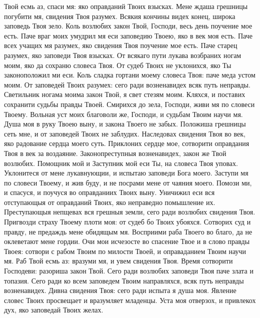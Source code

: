 \begin{mymulticols}
Твой есмь аз, спаси мя: яко оправданий Твоих взысках. Мене ждаша грешницы погубити мя, свидения Твоя разумех. Всякия кончины видех конец, широка заповедь Твоя зело. Коль возлюбих закон Твой, Господи, весь день поучение мое есть. Паче враг моих умудрил мя еси заповедию Твоею, яко в век моя есть. Паче всех учащих мя разумех, яко свидения Твоя поучение мое есть. Паче старец разумех, яко заповеди Твоя взысках. От всякаго пути лукава возбраних ногам моим, яко да сохраню словеса Твоя. От судеб Твоих не уклонихся, яко Ты законоположил ми еси. Коль сладка гортани моему словеса Твоя: паче меда устом моим. От заповедей Твоих разумех: сего ради возненавидех всяк путь неправды. Светильник ногама моима закон Твой, я свет стезям моим. Кляхся, и поставих сохранити судьбы правды Твоей. Смирихся до зела, Господи, живи мя по словеси Твоему. Вольная уст моих благоволи же, Господи, и судьбам Твоим научи мя. Душа моя в руку Твоею выну, и закона Твоего не забых. Положиша грешницы сеть мне, и от заповедей Твоих не заблудих. Наследовах свидения Твоя во век, яко радование сердца моего суть. Приклоних сердце мое, сотворити оправдания Твоя в век за воздаяние. Законопреступныя возненавидех, закон же Твой возлюбих. Помощник мой и Заступник мой еси Ты, на словеса Твоя уповах. Уклонитеся от мене лукавнующии, и испытаю заповеди Бога моего. Заступи мя по словеси Твоему, и жив буду, и не посрами мене от чаяния моего. Помози ми, и спасуся, и поучуся во оправданиих Твоих выну. Уничижил еси вся отступающыя от оправданий Твоих, яко неправедно помышление их. Преступающыя непщевах вся грешныя земли, сего ради возлюбих свидения Твоя. Пригвозди страху Твоему плоти моя: от судеб бо Твоих убояхся. Сотворих суд и правду, не предаждь мене обидящым мя. Восприими раба Твоего во благо, да не оклеветают мене гордии. Очи мои исчезосте во спасение Твое и в слово правды Твоея: сотвори с рабом Твоим по милости Твоей, и оправаданием Твоим научи мя. Раб Твой есмь аз: вразуми мя, и увем свидения Твоя. Время сотворити Господеви: разориша закон Твой. Сего ради возлюбих заповеди Твоя паче злата и топазия. Сего ради ко всем заповедем Твоим направляхся, всяк путь неправды возненавидех. Дивна свидения Твоя: сего ради испыта я душа моя. Явление словес Твоих просвещает и вразумляет младенцы. Уста моя отверзох, и привлекох дух, яко заповедай Твоих желах. 

\pominalnayaslava


\end{mymulticols}
